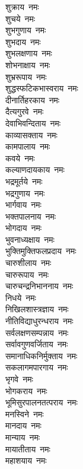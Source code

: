\begin{flushleft}
\begin{multicols}{2}
शुक्राय~नमः\\
शुचये~नमः\\
शुभगुणाय~नमः\\
शुभदाय~नमः\\
शुभलक्षणाय~नमः\\
शोभनाक्षाय~नमः\\
शुभ्ररूपाय~नमः\\
शुद्धस्फटिकभास्वराय~नमः\\
दीनार्तिहरकाय~नमः\\
दैत्यगुरवे~नमः\hfill{}\\
देवाभिवन्दिताय~नमः\\
काव्यासक्ताय~नमः\\
कामपालाय~नमः\\
कवये~नमः\\
कल्याणदायकाय~नमः\\
भद्रमूर्तये~नमः\\
भद्रगुणाय~नमः\\
भार्गवाय~नमः\\
भक्तपालनाय~नमः\\
भोगदाय~नमः\hfill{}\\
भुवनाध्यक्षाय~नमः\\
भुक्तिमुक्तिफलप्रदाय~नमः\\
चारुशीलाय~नमः\\
चारुरूपाय~नमः\\
चारुचन्द्रनिभाननाय~नमः\\
निधये~नमः\\
निखिलशास्त्रज्ञाय~नमः\\
नीतिविद्याधुरन्धराय~नमः\\
सर्वलक्षणसम्पन्नाय~नमः\\
सर्वावगुणवर्जिताय~नमः\hfill{}\\
समानाधिकनिर्मुक्ताय~नमः\\
सकलागमपारगाय~नमः\\
भृगवे~नमः\\
भोगकराय~नमः\\
भूमिसुरपालनतत्पराय~नमः\\
मनस्विने~नमः\\
मानदाय~नमः\\
मान्याय~नमः\\
मायातीताय~नमः\\
महाशयाय~नमः\hfill{}\\

\end{multicols}
\end{flushleft}
